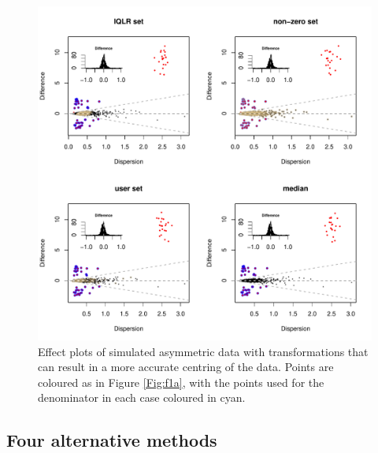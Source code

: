 \documentclass[10pt]{article}
\begin{document}
\begin{figure}[!ht]
\includegraphics[width=6in]{../figures/Fig_2.pdf}
\vspace{3mm} \caption{Effect plots of simulated asymmetric data with transformations that can result in a more accurate centring of the data. Points are coloured as in Figure \ref{Fig:f1a}, with the points used for the denominator in each case coloured in cyan.}
\label{Fig:f2a}
\end{figure}



\subsection{Four alternative methods}
\vskip-0.25cm
\end{document}
